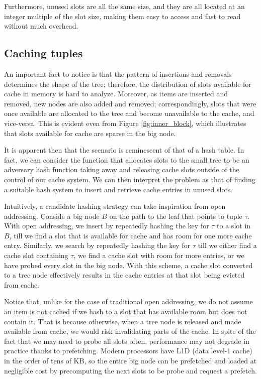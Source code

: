 \documentclass{article}
\begin{document}
Furthermore, unused slots are all the same size, and they are all located at an integer multiple
of the slot size, making them easy to access and fast to read without much overhead.


\subsection{Caching tuples}
An important fact to notice is that the pattern of insertions and removals determines the shape of the tree;
therefore, the distribution of slots available for cache in memory is hard to analyze.
Moreover, as items are inserted and removed, new nodes are also added and removed;
correspondingly, slots that were once available are allocated to the
tree and become unavailable to the cache, and vice-versa.
This is evident even from Figure \ref{fig:inner_block}, which illustrates that
slots available for cache are sparse in the big node.

It is apparent then that the scenario is reminescent of that of a hash table.
In fact, we can consider the function that allocates slots to the small tree to be an adversary
hash function taking away and releasing cache slots outside of the control of our cache system.
We can then interpret the problem as that of finding a suitable hash system to insert and retrieve
cache entries in unused slots.

Intuitively, a candidate hashing strategy can take inspiration from open addressing.
Conside a big node $B$ on the path to the leaf that points to tuple $\tau$.
With open addressing, we insert by repeatedly hashing the key for $\tau$ to a slot in $B$,
till we find a slot that is available for cache and has room for one more cache entry.
Similarly, we search by repeatedly hashing the key for $\tau$ till we either find
a cache slot containing $\tau$, we find a cache slot with room for more entries,
or we have probed every slot in the big node.
With this scheme, a cache slot converted to a tree node effectively results
in the cache entries at that slot being evicted from cache.

Notice that, unlike for the case of traditional open addressing, we do not assume an item is not cached
if we hash to a slot that has available room but does not contain it.
That is because otherwise, when a tree node is released and made available from cache, we would risk
invalidating parts of the cache.
In spite of the fact that we may need to probe all slots often, performance may not degrade in practice
thanks to prefetching.
Modern processors have L1D (data level-1 cache) in the order of tens of KB, so the entire big node
can be prefetched and loaded at negligible cost by precomputing the next slots to be probe and request
a prefetch.
\end{document}
